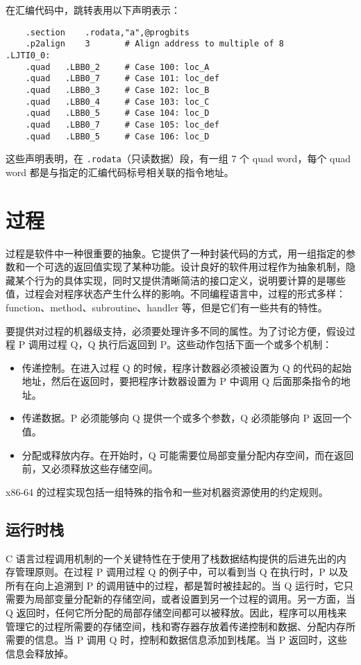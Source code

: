 在汇编代码中，跳转表用以下声明表示：
\begin{verbatim}
    .section    .rodata,"a",@progbits
    .p2align    3       # Align address to multiple of 8
.LJTI0_0:
    .quad   .LBB0_2     # Case 100: loc_A
    .quad   .LBB0_7     # Case 101: loc_def
    .quad   .LBB0_3     # Case 102: loc_B
    .quad   .LBB0_4     # Case 103: loc_C
    .quad   .LBB0_5     # Case 104: loc_D
    .quad   .LBB0_7     # Case 105: loc_def
    .quad   .LBB0_5     # Case 106: loc_D
\end{verbatim}
这些声明表明，在 \verb|.rodata|（只读数据）段，有一组 7 个 quad word，每个 quad word 都是与指定的汇编代码标号相关联的指令地址。

\section{过程}

过程是软件中一种很重要的抽象。它提供了一种封装代码的方式，用一组指定的参数和一个可选的返回值实现了某种功能。设计良好的软件用过程作为抽象机制，隐藏某个行为的具体实现，同时又提供清晰简洁的接口定义，说明要计算的是哪些值，过程会对程序状态产生什么样的影响。不同编程语言中，过程的形式多样：function、method、subroutine、handler 等，但是它们有一些共有的特性。

要提供对过程的机器级支持，必须要处理许多不同的属性。为了讨论方便，假设过程 P 调用过程 Q，Q 执行后返回到 P。这些动作包括下面一个或多个机制：
\begin{itemize}
    \item 传递控制。在进入过程 Q 的时候，程序计数器必须被设置为 Q 的代码的起始地址，然后在返回时，要把程序计数器设置为 P 中调用 Q 后面那条指令的地址。
    \item 传递数据。P 必须能够向 Q 提供一个或多个参数，Q 必须能够向 P 返回一个值。
    \item 分配或释放内存。在开始时，Q 可能需要位局部变量分配内存空间，而在返回前，又必须释放这些存储空间。
\end{itemize}

x86-64 的过程实现包括一组特殊的指令和一些对机器资源使用的约定规则。

\subsection{运行时栈}

C 语言过程调用机制的一个关键特性在于使用了栈数据结构提供的后进先出的内存管理原则。在过程 P 调用过程 Q 的例子中，可以看到当 Q 在执行时，P 以及所有在向上追溯到 P 的调用链中的过程，都是暂时被挂起的。当 Q 运行时，它只需要为局部变量分配新的存储空间，或者设置到另一个过程的调用。另一方面，当 Q 返回时，任何它所分配的局部存储空间都可以被释放。因此，程序可以用栈来管理它的过程所需要的存储空间，栈和寄存器存放着传递控制和数据、分配内存所需要的信息。当 P 调用 Q 时，控制和数据信息添加到栈尾。当 P 返回时，这些信息会释放掉。

